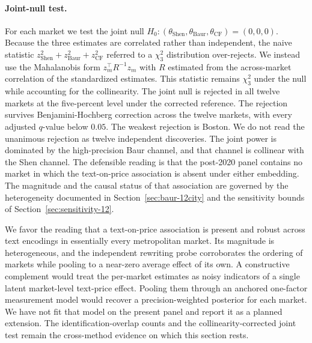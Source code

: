 \paragraph{Joint-null test.} For each market we test the joint null
$H_0: (\theta_{\mathrm{Shen}}, \theta_{\mathrm{Baur}}, \theta_{\mathrm{CF}}) =
(0, 0, 0)$. Because the three estimates are correlated rather than independent, the naive statistic $z^2_{\mathrm{Shen}} + z^2_{\mathrm{Baur}} + z^2_{\mathrm{CF}}$ referred to a $\chi^2_3$ distribution over-rejects. We instead use the Mahalanobis form $z_m^\top R^{-1} z_m$ with $R$ estimated from the across-market correlation of the standardized estimates. This statistic remains $\chi^2_3$ under the null while accounting for the collinearity. The joint null is rejected in all twelve markets at the five-percent level under the corrected reference. The rejection survives Benjamini-Hochberg correction across the twelve markets, with every adjusted $q$-value below $0.05$. The weakest
rejection is Boston. We do not read the unanimous rejection as twelve independent discoveries. The joint power is dominated by the high-precision Baur channel, and that channel is collinear with the Shen channel. The defensible reading is that the post-2020 panel contains no market in which the text-on-price association is absent under either embedding. The magnitude and the causal status of that association are governed by the heterogeneity documented in Section~\ref{sec:baur-12city} and the sensitivity bounds of Section~\ref{sec:sensitivity-12}.

We favor the reading that a text-on-price association is present and robust across text encodings in essentially every metropolitan market. Its magnitude is heterogeneous, and the independent rewriting probe corroborates the ordering of markets while pooling to a near-zero average effect of its own. A constructive complement would treat the per-market estimates as noisy indicators of a single latent market-level text-price effect. Pooling them through an anchored one-factor measurement model would recover a precision-weighted posterior for each market. We have not fit that model on the present panel and report it as a planned extension. The identification-overlap counts and the collinearity-corrected joint test remain the cross-method evidence on which this section rests.


